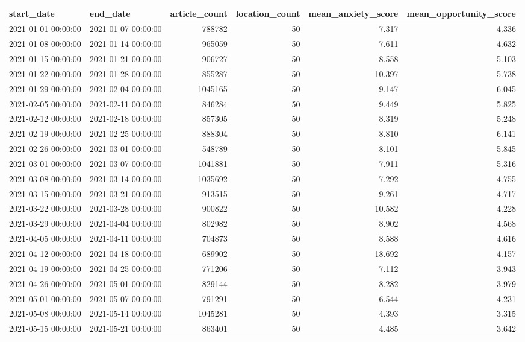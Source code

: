 \begin{tabular}{llrrrr}
\toprule
start\_date & end\_date & article\_count & location\_count & mean\_anxiety\_score & mean\_opportunity\_score \\
\midrule
2021-01-01 00:00:00 & 2021-01-07 00:00:00 & 788782 & 50 & 7.317 & 4.336 \\
2021-01-08 00:00:00 & 2021-01-14 00:00:00 & 965059 & 50 & 7.611 & 4.632 \\
2021-01-15 00:00:00 & 2021-01-21 00:00:00 & 906727 & 50 & 8.558 & 5.103 \\
2021-01-22 00:00:00 & 2021-01-28 00:00:00 & 855287 & 50 & 10.397 & 5.738 \\
2021-01-29 00:00:00 & 2021-02-04 00:00:00 & 1045165 & 50 & 9.147 & 6.045 \\
2021-02-05 00:00:00 & 2021-02-11 00:00:00 & 846284 & 50 & 9.449 & 5.825 \\
2021-02-12 00:00:00 & 2021-02-18 00:00:00 & 857305 & 50 & 8.319 & 5.248 \\
2021-02-19 00:00:00 & 2021-02-25 00:00:00 & 888304 & 50 & 8.810 & 6.141 \\
2021-02-26 00:00:00 & 2021-03-01 00:00:00 & 548789 & 50 & 8.101 & 5.845 \\
2021-03-01 00:00:00 & 2021-03-07 00:00:00 & 1041881 & 50 & 7.911 & 5.316 \\
2021-03-08 00:00:00 & 2021-03-14 00:00:00 & 1035692 & 50 & 7.292 & 4.755 \\
2021-03-15 00:00:00 & 2021-03-21 00:00:00 & 913515 & 50 & 9.261 & 4.717 \\
2021-03-22 00:00:00 & 2021-03-28 00:00:00 & 900822 & 50 & 10.582 & 4.228 \\
2021-03-29 00:00:00 & 2021-04-04 00:00:00 & 802982 & 50 & 8.902 & 4.568 \\
2021-04-05 00:00:00 & 2021-04-11 00:00:00 & 704873 & 50 & 8.588 & 4.616 \\
2021-04-12 00:00:00 & 2021-04-18 00:00:00 & 689902 & 50 & 18.692 & 4.157 \\
2021-04-19 00:00:00 & 2021-04-25 00:00:00 & 771206 & 50 & 7.112 & 3.943 \\
2021-04-26 00:00:00 & 2021-05-01 00:00:00 & 829144 & 50 & 8.282 & 3.979 \\
2021-05-01 00:00:00 & 2021-05-07 00:00:00 & 791291 & 50 & 6.544 & 4.231 \\
2021-05-08 00:00:00 & 2021-05-14 00:00:00 & 1045281 & 50 & 4.393 & 3.315 \\
2021-05-15 00:00:00 & 2021-05-21 00:00:00 & 863401 & 50 & 4.485 & 3.642 \\

\end{tabular}
